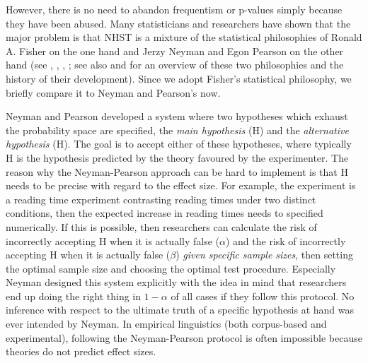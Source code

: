 However, there is no need to abandon frequentism or p-values simply because they have been abused.
Many statisticians and researchers have shown that the major problem is that NHST is a mixture of the statistical philosophies of Ronald A. Fisher on the one hand and Jerzy Neyman and Egon Pearson on the other hand (see \citealt{Goodman2008}, \citealt{Perezgonzalez2014}, \citealt{Perezgonzalez2015}, \citealt{GreenlandEa2016}; see also \citealt{Lehmann1993} and \citealt{Lehmann2011} for an overview of these two philosophies and the history of their development).
Since we adopt Fisher's statistical philosophy, we briefly compare it to Neyman and Pearson's now.

Neyman and Pearson developed a system where two hypotheses which exhaust the probability space are specified, the \textit{main hypothesis} (H) and the \textit{alternative hypothesis} (H).
The goal is to accept either of these hypotheses, where typically H is the hypothesis predicted by the theory favoured by the experimenter.
The reason why the Neyman-Pearson approach can be hard to implement is that H needs to be precise with regard to the effect size.
For example, the experiment is a reading time experiment contrasting reading times under two distinct conditions, then the expected increase in reading times needs to specified numerically.
If this is possible, then researchers can calculate the risk of incorrectly accepting H when it is actually false ($\alpha$) and the risk of incorrectly accepting H when it is actually false ($\beta$) \textit{given specific sample sizes}, then setting the optimal sample size and choosing the optimal test procedure.
Especially Neyman designed this system explicitly with the idea in mind that researchers end up doing the right thing in $1-\alpha$ of all cases if they follow this protocol.
No inference with respect to the ultimate truth of a specific hypothesis at hand was ever intended by Neyman.
In empirical linguistics (both corpus-based and experimental), following the Neyman-Pearson protocol is often impossible because theories do not predict effect sizes.


